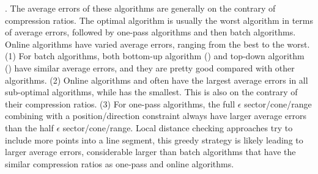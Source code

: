 . The average errors of these algorithms  are generally on the contrary of compression ratios. The optimal algorithm is usually  the worst algorithm in terms of average errors, followed by one-pass algorithms and then batch algorithms.
Online algorithms have varied average errors, ranging from the best to the worst.
(1) For batch algorithms, both bottom-up algorithm (\tpa) and top-down algorithm (\dpa) have similar average errors, and they are pretty good compared with other algorithms.
%
(2) Online algorithms \bqsa and \opwa often have the largest average errors in all sub-optimal algorithms, while \squishe has the smallest. This is also on the contrary of their compression ratios.
%
(3) For one-pass algorithms, the full $\epsilon$ sector/cone/range combining with a position/direction constraint always have larger average errors than the half $\epsilon$ sector/cone/range.
%
Local distance checking approaches try to include more points into a line segment, this greedy strategy is likely leading to larger average errors, considerable larger than batch algorithms that have the similar compression ratios as one-pass and online algorithms.



